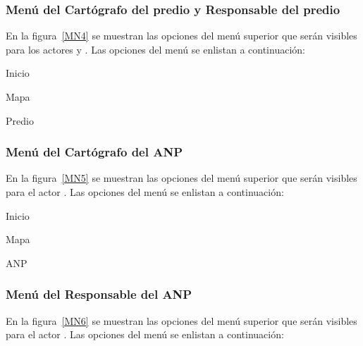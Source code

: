     
\subsubsection{Menú del Cartógrafo del predio y Responsable del predio}

    En la figura~\ref{MN4} se muestran las opciones del menú superior que serán visibles para los actores  y . Las opciones del menú se enlistan a continuación:

    \begin{Citemize}
      \item Inicio
      \item Mapa
      \item Predio
    \end{Citemize}


\subsubsection{Menú del Cartógrafo del ANP}

    En la figura~\ref{MN5} se muestran las opciones del menú superior que serán visibles para el actor . Las opciones del menú se enlistan a continuación:

    \begin{Citemize}
	    \item Inicio
	    \item Mapa
	    \item ANP
    \end{Citemize}


\subsubsection{Menú del Responsable del ANP}

    En la figura~\ref{MN6} se muestran las opciones del menú superior que serán visibles para el actor . Las opciones del menú se enlistan a continuación:

